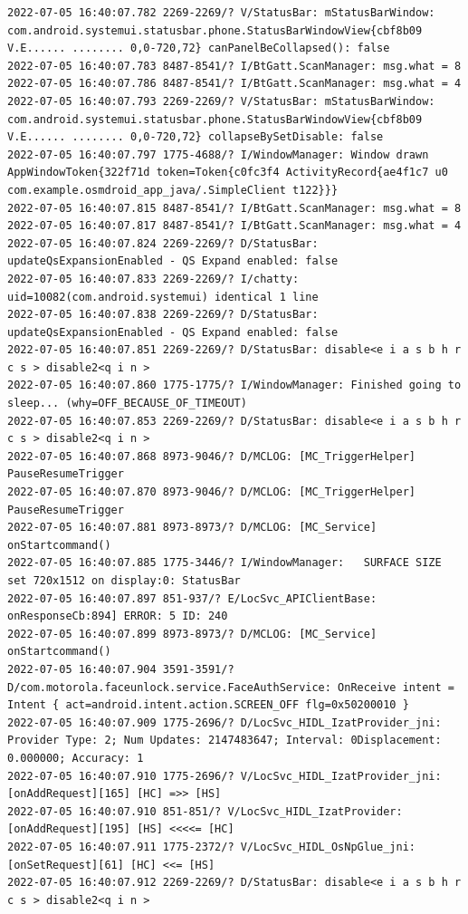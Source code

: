 \documentclass[a4paper,12pt]{book}
\begin{document}
\begin{lstlisting}
2022-07-05 16:40:07.782 2269-2269/? V/StatusBar: mStatusBarWindow: com.android.systemui.statusbar.phone.StatusBarWindowView{cbf8b09 V.E...... ........ 0,0-720,72} canPanelBeCollapsed(): false
2022-07-05 16:40:07.783 8487-8541/? I/BtGatt.ScanManager: msg.what = 8
2022-07-05 16:40:07.786 8487-8541/? I/BtGatt.ScanManager: msg.what = 4
2022-07-05 16:40:07.793 2269-2269/? V/StatusBar: mStatusBarWindow: com.android.systemui.statusbar.phone.StatusBarWindowView{cbf8b09 V.E...... ........ 0,0-720,72} collapseBySetDisable: false
2022-07-05 16:40:07.797 1775-4688/? I/WindowManager: Window drawn AppWindowToken{322f71d token=Token{c0fc3f4 ActivityRecord{ae4f1c7 u0 com.example.osmdroid_app_java/.SimpleClient t122}}}
2022-07-05 16:40:07.815 8487-8541/? I/BtGatt.ScanManager: msg.what = 8
2022-07-05 16:40:07.817 8487-8541/? I/BtGatt.ScanManager: msg.what = 4
2022-07-05 16:40:07.824 2269-2269/? D/StatusBar: updateQsExpansionEnabled - QS Expand enabled: false
2022-07-05 16:40:07.833 2269-2269/? I/chatty: uid=10082(com.android.systemui) identical 1 line
2022-07-05 16:40:07.838 2269-2269/? D/StatusBar: updateQsExpansionEnabled - QS Expand enabled: false
2022-07-05 16:40:07.851 2269-2269/? D/StatusBar: disable<e i a s b h r c s > disable2<q i n >
2022-07-05 16:40:07.860 1775-1775/? I/WindowManager: Finished going to sleep... (why=OFF_BECAUSE_OF_TIMEOUT)
2022-07-05 16:40:07.853 2269-2269/? D/StatusBar: disable<e i a s b h r c s > disable2<q i n >
2022-07-05 16:40:07.868 8973-9046/? D/MCLOG: [MC_TriggerHelper] PauseResumeTrigger
2022-07-05 16:40:07.870 8973-9046/? D/MCLOG: [MC_TriggerHelper] PauseResumeTrigger
2022-07-05 16:40:07.881 8973-8973/? D/MCLOG: [MC_Service] onStartcommand()
2022-07-05 16:40:07.885 1775-3446/? I/WindowManager:   SURFACE SIZE set 720x1512 on display:0: StatusBar
2022-07-05 16:40:07.897 851-937/? E/LocSvc_APIClientBase: onResponseCb:894] ERROR: 5 ID: 240
2022-07-05 16:40:07.899 8973-8973/? D/MCLOG: [MC_Service] onStartcommand()
2022-07-05 16:40:07.904 3591-3591/? D/com.motorola.faceunlock.service.FaceAuthService: OnReceive intent = Intent { act=android.intent.action.SCREEN_OFF flg=0x50200010 }
2022-07-05 16:40:07.909 1775-2696/? D/LocSvc_HIDL_IzatProvider_jni: Provider Type: 2; Num Updates: 2147483647; Interval: 0Displacement: 0.000000; Accuracy: 1
2022-07-05 16:40:07.910 1775-2696/? V/LocSvc_HIDL_IzatProvider_jni: [onAddRequest][165] [HC] =>> [HS]
2022-07-05 16:40:07.910 851-851/? V/LocSvc_HIDL_IzatProvider: [onAddRequest][195] [HS] <<<<= [HC]
2022-07-05 16:40:07.911 1775-2372/? V/LocSvc_HIDL_OsNpGlue_jni: [onSetRequest][61] [HC] <<= [HS]
2022-07-05 16:40:07.912 2269-2269/? D/StatusBar: disable<e i a s b h r c s > disable2<q i n >

\end{lstlisting}
\end{document}
